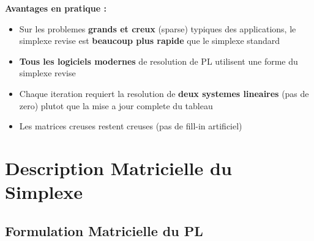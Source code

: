 \documentclass[12pt,a4paper]{article}
\begin{document}
\begin{important}
\textbf{Avantages en pratique :}

\begin{itemize}
    \item Sur les problemes \textcolor{titrebleu}{\textbf{grands et creux}} (sparse) typiques des applications, le simplexe revise est \textbf{beaucoup plus rapide} que le simplexe standard
    \item \textcolor{defvert}{\textbf{Tous les logiciels modernes}} de resolution de PL utilisent une forme du simplexe revise
    \item Chaque iteration requiert la resolution de \textcolor{algoviolet}{\textbf{deux systemes lineaires}} (pas de zero) plutot que la mise a jour complete du tableau
    \item Les matrices creuses restent creuses (pas de fill-in artificiel)
\end{itemize}
\end{important}

\newpage
\section{Description Matricielle du Simplexe}

\subsection{Formulation Matricielle du PL}
\end{document}
